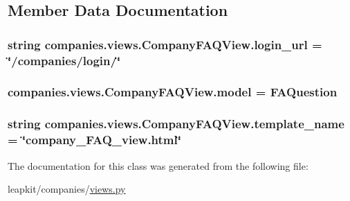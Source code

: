 \subsection{Member Data Documentation}
\hypertarget{classcompanies_1_1views_1_1_company_f_a_q_view_a1c946844c06beee8118e49ea30c981d9}{
\subsubsection[{login\-\_\-url}]{\setlength{\rightskip}{0pt plus 5cm}string companies.\-views.\-Company\-F\-A\-Q\-View.\-login\-\_\-url = \char`\"{}/companies/login/\char`\"{}\hspace{0.3cm}{\ttfamily [static]}}}\label{classcompanies_1_1views_1_1_company_f_a_q_view_a1c946844c06beee8118e49ea30c981d9}
\hypertarget{classcompanies_1_1views_1_1_company_f_a_q_view_a9a867a5bce7bf501cd4b8eba209bc589}{
\subsubsection[{model}]{\setlength{\rightskip}{0pt plus 5cm}companies.\-views.\-Company\-F\-A\-Q\-View.\-model = {\bf F\-A\-Question}\hspace{0.3cm}{\ttfamily [static]}}}\label{classcompanies_1_1views_1_1_company_f_a_q_view_a9a867a5bce7bf501cd4b8eba209bc589}
\hypertarget{classcompanies_1_1views_1_1_company_f_a_q_view_a34965c7cafb7c95ee3a1f4abc9b6d3ac}{
\subsubsection[{template\-\_\-name}]{\setlength{\rightskip}{0pt plus 5cm}string companies.\-views.\-Company\-F\-A\-Q\-View.\-template\-\_\-name = \char`\"{}company\-\_\-\-F\-A\-Q\-\_\-view.\-html\char`\"{}\hspace{0.3cm}{\ttfamily [static]}}}\label{classcompanies_1_1views_1_1_company_f_a_q_view_a34965c7cafb7c95ee3a1f4abc9b6d3ac}


The documentation for this class was generated from the following file\-:\begin{DoxyCompactItemize}
\item 
leapkit/companies/\hyperlink{companies_2views_8py}{views.\-py}\end{DoxyCompactItemize}
